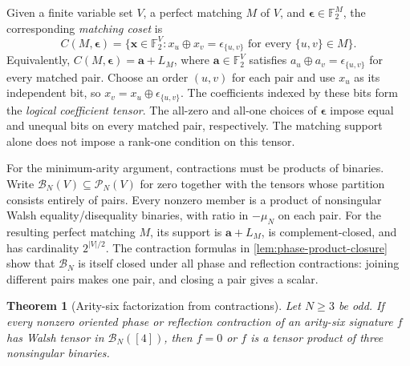 \documentclass[11pt,letterpaper,onecolumn]{article}
\theoremstyle{plain}
\newtheorem{theorem}{Theorem}[section]
\theoremstyle{definition}
\theoremstyle{remark}
\newcommand{\Ftwo}{\mathbb F_2}
\begin{document}
Given a finite variable set \(V\), a perfect matching \(M\) of \(V\), and
	\({\boldsymbol{\epsilon}}\in\Ftwo^M\), the corresponding \emph{matching coset} is
	\[
	C(M,{\boldsymbol{\epsilon}})=
	\{{\mathbf x}\in\Ftwo^V:x_u\oplus x_v=\epsilon_{\{u,v\}}
	\text{ for every }\{u,v\}\in M\}.
	\]
Equivalently, \(C(M,{\boldsymbol{\epsilon}})={\mathbf a}+L_M\), where \({\mathbf a}\in\Ftwo^V\) satisfies
\(a_u\oplus a_v=\epsilon_{\{u,v\}}\) for every matched pair.
Choose an order \((u,v)\) for each pair and use \(x_u\) as its independent
bit, so \(x_v=x_u\oplus\epsilon_{\{u,v\}}\). The coefficients indexed by
these bits form the \emph{logical coefficient tensor}.
The all-zero and all-one choices of \({\boldsymbol{\epsilon}}\) impose
equal and unequal bits on every matched pair, respectively.
The matching support alone does not impose a rank-one condition on this tensor.

	For the minimum-arity argument, contractions must be products of binaries.
	Write \(\mathcal B_N(V)\subseteq\mathcal P_N(V)\) for zero together with
	the tensors whose partition consists entirely of pairs.  Every nonzero
	member is a product of nonsingular Walsh equality/disequality binaries,
	with ratio in \(-\mu_N\) on each pair.  For the resulting perfect matching
	\(M\), its support is \({\mathbf a}+L_M\), is complement-closed, and has
	cardinality \(2^{|V|/2}\).
	The contraction formulas in \cref{lem:phase-product-closure} show that
	\(\mathcal B_N\) is itself closed under all phase and reflection contractions:
	joining different pairs makes one pair, and closing a pair gives a scalar.
	
	\begin{theorem}[Arity-six factorization from contractions]
		\label{thm:odd-dih-q6-base}
		Let \(N\ge3\) be odd.  If every nonzero oriented phase or reflection contraction
		of an arity-six signature \(f\) has Walsh tensor in \(\mathcal B_N([4])\),
		then \(f=0\) or \(f\) is a tensor product of three nonsingular binaries.
	\end{theorem}
	
\end{document}

